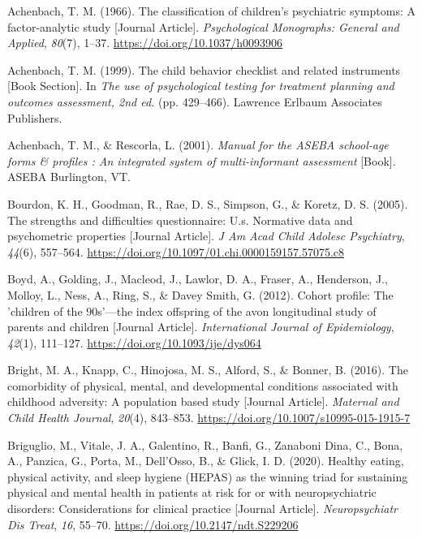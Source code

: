\documentclass[
  letterpaper,
  DIV=11,
  numbers=noendperiod]{scrreport}
\newlength{\cslhangindent}
\newenvironment{CSLReferences}[2] %
 {\begin{list}{}{%
  \setlength{\itemindent}{0pt}
  \setlength{\leftmargin}{0pt}
  \setlength{\parsep}{0pt}
  \ifodd #1
   \setlength{\leftmargin}{\cslhangindent}
   \setlength{\itemindent}{-1\cslhangindent}
  \fi
  \setlength{\itemsep}{#2\baselineskip}}}
 {\end{list}}
\begin{document}
\label{refs--3}
\begin{CSLReferences}{1}{0}
Achenbach, T. M. (1966). The classification of children's psychiatric
symptoms: A factor-analytic study {[}Journal Article{]}.
\emph{Psychological Monographs: General and Applied}, \emph{80}(7),
1--37. \url{https://doi.org/10.1037/h0093906}

Achenbach, T. M. (1999). The child behavior checklist and related
instruments {[}Book Section{]}. In \emph{The use of psychological
testing for treatment planning and outcomes assessment, 2nd ed.} (pp.
429--466). Lawrence Erlbaum Associates Publishers.

Achenbach, T. M., \& Rescorla, L. (2001). \emph{Manual for the ASEBA
school-age forms \& profiles : An integrated system of multi-informant
assessment} {[}Book{]}. ASEBA Burlington, VT.

Bourdon, K. H., Goodman, R., Rae, D. S., Simpson, G., \& Koretz, D. S.
(2005). The strengths and difficulties questionnaire: U.s. Normative
data and psychometric properties {[}Journal Article{]}. \emph{J Am Acad
Child Adolesc Psychiatry}, \emph{44}(6), 557--564.
\url{https://doi.org/10.1097/01.chi.0000159157.57075.c8}

Boyd, A., Golding, J., Macleod, J., Lawlor, D. A., Fraser, A.,
Henderson, J., Molloy, L., Ness, A., Ring, S., \& Davey Smith, G.
(2012). Cohort profile: The 'children of the 90s'---the index offspring
of the avon longitudinal study of parents and children {[}Journal
Article{]}. \emph{International Journal of Epidemiology}, \emph{42}(1),
111--127. \url{https://doi.org/10.1093/ije/dys064}

Bright, M. A., Knapp, C., Hinojosa, M. S., Alford, S., \& Bonner, B.
(2016). The comorbidity of physical, mental, and developmental
conditions associated with childhood adversity: A population based study
{[}Journal Article{]}. \emph{Maternal and Child Health Journal},
\emph{20}(4), 843--853. \url{https://doi.org/10.1007/s10995-015-1915-7}

Briguglio, M., Vitale, J. A., Galentino, R., Banfi, G., Zanaboni Dina,
C., Bona, A., Panzica, G., Porta, M., Dell'Osso, B., \& Glick, I. D.
(2020). Healthy eating, physical activity, and sleep hygiene (HEPAS) as
the winning triad for sustaining physical and mental health in patients
at risk for or with neuropsychiatric disorders: Considerations for
clinical practice {[}Journal Article{]}. \emph{Neuropsychiatr Dis
Treat}, \emph{16}, 55--70. \url{https://doi.org/10.2147/ndt.S229206}


\end{CSLReferences}
\end{document}
